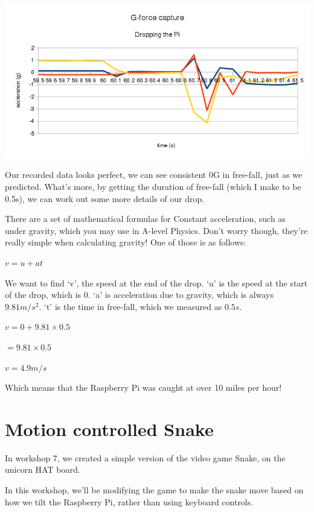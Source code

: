 \documentclass[a4paper, twocolumn, twoside, 12pt]{article}
\begin{document}
		\begin{center}
			\includegraphics[width=1\linewidth]{img/graph_detail}
		\end{center}
		
		Our recorded data looks perfect, we can see consistent 0G in free-fall, just as we predicted. What's more, by getting the duration of free-fall (which I make to be 0.5s), we can work out some more details of our drop.
		
		There are a set of mathematical formulas for Constant acceleration, such as under gravity, which you may use in A-level Physics. Don't worry though, they're really simple when calculating gravity! One of those is as follows:
		
		$v = u + at$
		
		We want to find `v', the speed at the end of the drop. `u' is the speed at the start of the drop, which is 0. `a' is acceleration due to gravity, which is always $9.81m/s^{2}$. `t' is the time in free-fall, which we measured as $0.5s$.
		
		$v = 0 + 9.81 \times 0.5$
		
		$= 9.81 \times 0.5$
		
		$v = 4.9 m/s$
		
		Which means that the Raspberry Pi was caught at over 10 miles per hour!
		
	\section{Motion controlled Snake}
	
		In workshop 7, we created a simple version of the video game Snake, on the unicorn HAT board.
		
		In this workshop, we'll be modifying the game to make the snake move based on how we tilt the Raspberry Pi, rather than using keyboard controls.
\end{document}
